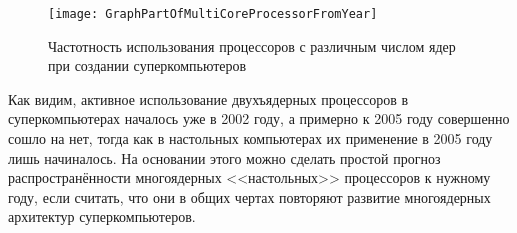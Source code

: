 \begin{figure}[H]
    \centering
    \texttt{[image: GraphPartOfMultiCoreProcessorFromYear]}
    \caption{Частотность использования процессоров с различным числом ядер при создании суперкомпьютеров}
    \label{fig:GraphPartOfMultiCoreProcessorFromYear}
\end{figure}

Как видим, активное использование двухъядерных процессоров в суперкомпьютерах началось уже в 2002 году, а примерно к 2005 году совершенно сошло на нет, тогда как в настольных компьютерах их применение в 2005 году лишь начиналось.
На основании этого можно сделать простой прогноз распространённости многоядерных <<настольных>> процессоров к нужному году, если считать, что они в общих чертах повторяют развитие многоядерных архитектур суперкомпьютеров.
